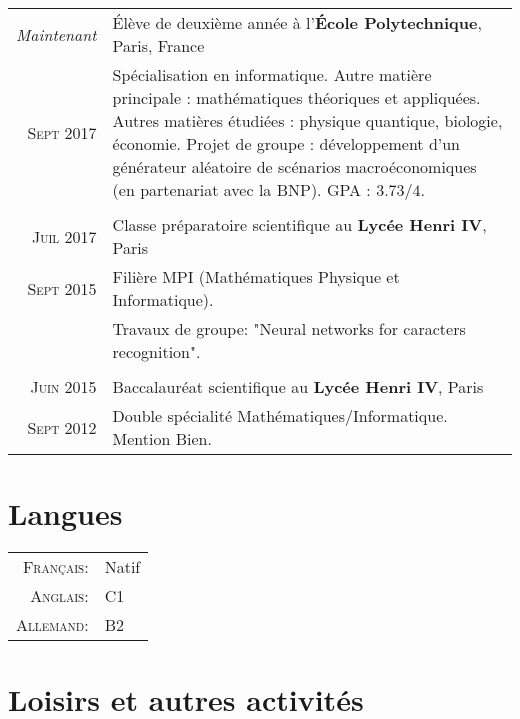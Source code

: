 \documentclass[a4paper,10pt]{article} %
\begin{document}
\begin{tabularx}{\linewidth}{r|X}
\emph{Maintenant} & Élève de deuxième année à l'\textbf{École Polytechnique}, Paris, France \\
\textsc{Sept} 2017 & \small{Spécialisation en informatique. Autre matière principale : mathématiques théoriques et appliquées.
Autres matières étudiées : physique quantique, biologie, économie. Projet de groupe : développement d'un générateur aléatoire de scénarios macroéconomiques (en partenariat avec la BNP).
GPA : $3.73/4$.}
\\ & \\

\textsc{Juil 2017} & Classe préparatoire scientifique au \textbf{Lycée Henri IV}, Paris\\
\textsc{Sept 2015} & \small{Filière MPI (Mathématiques Physique et Informatique)}.\\
  & \small{Travaux de groupe: "Neural networks for caracters recognition".}
\\&\\

\textsc{Juin 2015} & Baccalauréat scientifique au \textbf{Lycée Henri IV}, Paris\\
\textsc{Sept 2012} & \small{Double spécialité Mathématiques/Informatique. Mention Bien.}
\end{tabularx}


\section{Langues}

\begin{tabular}{rl}
  \textsc{Français:} & Natif \\
  \textsc{Anglais:} & C1\\
  \textsc{Allemand:} & B2\\
\end{tabular}


\section{Loisirs et autres activités}
\end{document}
